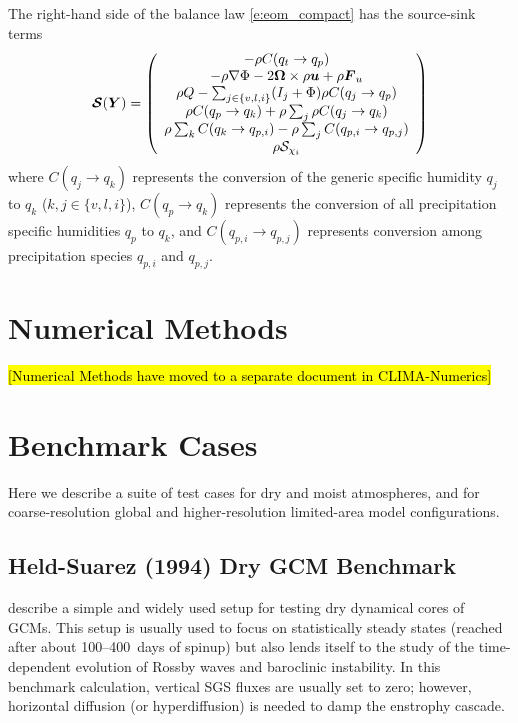 \documentclass{report}
\begin{document}
The right-hand side of the balance law \eqref{e:eom_compact} has the source-sink terms
\begin{multline}
\Source(\vec{Y})= 
 \left( \begin{array}{c}
 -\rho C(q_t \rightarrow q_p) \\
  -\rho \nabla\Phi - 2 \vec{\Omega} \times \rho\vec{u}  + \rho \vec{F}_u \\
 \rho Q - \sum_{j\in\{v,l,i\}} (I_j + \Phi)  \rho C(q_j \rightarrow q_p) \\%
\rho C(q_p \rightarrow q_k) + \rho \sum_j \rho C(q_j \rightarrow q_k) \\
\rho \sum_k C(q_k \rightarrow q_{p, i}) - \rho \sum_j C(q_{p, i} \rightarrow q_{p, j})\\
\rho \mathcal{S}_{\chi_i}
\end{array}
\right)
\label{eq:source}
\end{multline}
where $C(q_j \rightarrow q_k)$ represents the conversion of the generic specific humidity $q_j$ to $q_k$ ($k, j \in \{v, l, i\}$), $C(q_p \rightarrow q_k)$ represents the conversion of all precipitation specific humidities $q_p$ to $q_k$, and $C(q_{p, i} \rightarrow q_{p, j})$ represents conversion among precipitation species $q_{p, i}$ and $q_{p, j}$. 

\chapter{Numerical Methods}\label{sec:numerical_methods}

\hl{[Numerical Methods have moved to a separate document in CLIMA-Numerics]}

\chapter{Benchmark Cases}

Here we describe a suite of test cases for dry and moist atmospheres, and for coarse-resolution global and higher-resolution limited-area model configurations. 

\section{Held-Suarez (1994) Dry GCM Benchmark}

\citet{Held94} describe a simple and widely used setup for testing dry dynamical cores of GCMs. This setup is usually used to focus on statistically steady states (reached after about 100--400~days of spinup) but also lends itself to the study of the time-dependent evolution of Rossby waves and baroclinic instability. In this benchmark calculation, vertical SGS fluxes are usually set to zero; however, horizontal diffusion (or hyperdiffusion) is needed to damp the enstrophy cascade. 
\end{document}
